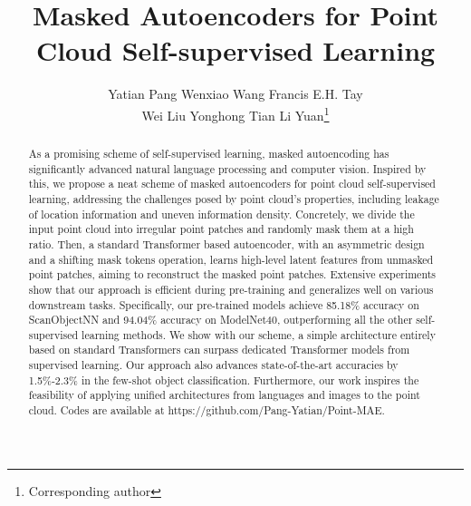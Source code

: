 \documentclass[runningheads]{llncs}
\begin{document}
\pagestyle{headings}
\mainmatter
\def\ECCVSubNumber{800}  

\title{Masked Autoencoders for Point Cloud Self-supervised Learning} 

\begin{comment}
\titlerunning{ECCV-22 submission ID \ECCVSubNumber} 
\authorrunning{ECCV-22 submission ID \ECCVSubNumber} 
\author{Anonymous ECCV submission}
\institute{Paper ID \ECCVSubNumber}
\end{comment}


\author{Yatian Pang \quad
Wenxiao Wang \quad
Francis E.H. Tay \quad  \\
Wei Liu \quad
Yonghong Tian \quad
Li Yuan\thanks{Corresponding author}}



\maketitle

\begin{abstract}
As a promising scheme of self-supervised learning, masked autoencoding has significantly advanced natural language processing and computer vision. Inspired by this, we propose a neat scheme of masked autoencoders for point cloud self-supervised learning, addressing the challenges posed by point cloud's properties, including leakage of location information and uneven information density. Concretely, we divide the input point cloud into irregular point patches and randomly mask them at a high ratio. Then, a standard Transformer based autoencoder, with an asymmetric design and a shifting mask tokens operation, learns high-level latent features from unmasked point patches, aiming to reconstruct the masked point patches. Extensive experiments show that our approach is efficient during pre-training and generalizes well on various downstream tasks. Specifically, our pre-trained models achieve 85.18\% accuracy on ScanObjectNN and 94.04\% accuracy on ModelNet40, outperforming all the other self-supervised learning methods. We show with our scheme, a simple architecture entirely based on standard Transformers can surpass dedicated Transformer models from supervised learning. Our approach also advances state-of-the-art accuracies by 1.5\%-2.3\% in the few-shot object classification. Furthermore, our work inspires the feasibility of applying unified architectures from languages and images to the point cloud. Codes are available at https://github.com/Pang-Yatian/Point-MAE.
\end{abstract}
\end{document}
